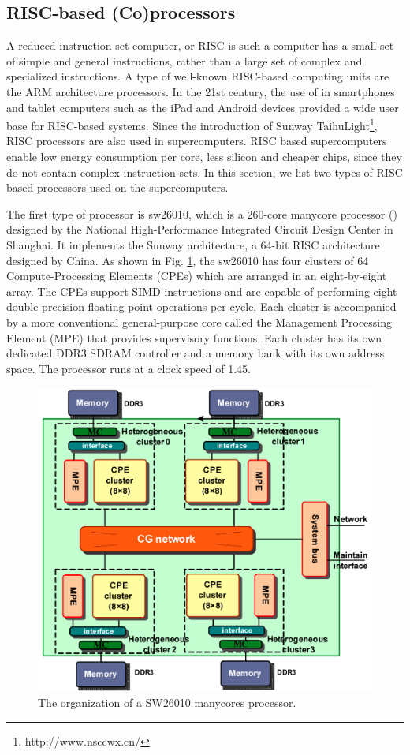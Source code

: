 \subsection{RISC-based (Co)processors}

A reduced instruction set computer, or RISC  is such a computer has a small set of simple and general instructions, rather than a large set of complex and specialized instructions. A type of well-known RISC-based computing units are the ARM architecture processors. In the 21st century, the use of in smartphones and tablet computers such as the iPad and Android devices provided a wide user base for RISC-based systems. Since the introduction of Sunway TaihuLight\footnote{http://www.nsccwx.cn/}, RISC processors are also used in supercomputers. RISC based supercomputers enable low energy consumption per core, less silicon and cheaper chips, since they do not contain complex instruction sets. In this section, we list two types of RISC based processors used on the supercomputers.

The first type of processor is sw26010, which is a 260-core manycore processor (\cite{fu2016sunway}) designed by the National High-Performance Integrated Circuit Design Center in Shanghai. It implements the Sunway architecture, a 64-bit RISC architecture designed by China. As shown in Fig. \ref{fig:sw26010}, the sw26010 has four clusters of 64 Compute-Processing Elements (CPEs) which are arranged in an eight-by-eight array. The CPEs support SIMD instructions and are capable of performing eight double-precision floating-point operations per cycle. Each cluster is accompanied by a more conventional general-purpose core called the Management Processing Element (MPE) that provides supervisory functions. Each cluster has its own dedicated DDR3 SDRAM controller and a memory bank with its own address space. The processor runs at a clock speed of 1.45.

\begin{figure}[htbp]
	\centering
	\includegraphics[width=4.6in]{fig/sw26010.png}
	\caption{The organization of a SW26010 manycores processor.}
	\label{fig:sw26010}
\end{figure}

